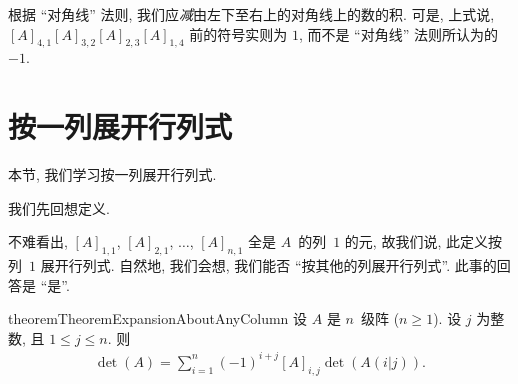 \begin{example}
    根据 ``对角线'' 法则,
    我们应\emph{减}由左下至右上的对角线上的数的积.
    可是, 上式说,
    \([A]_{4,1} [A]_{3,2} [A]_{2,3} [A]_{1,4}\)
    前的符号实则为 \(1\),
    而不是 ``对角线'' 法则所认为的 \(-1\).
    \begin{tikzbildo*}[h!]
        \centering
    \end{tikzbildo*}
\end{example}

\section{按一列展开行列式}

本节, 我们学习按一列展开行列式.

我们先回想定义.

\DefinitionDeterminants*

不难看出,
\([A]_{1,1}\), \([A]_{2,1}\), \(\dots\), \([A]_{n,1}\)
全是 \(A\)~的列~\(1\) 的元,
故我们说,
此定义按列~\(1\) 展开行列式.
自然地, 我们会想,
我们能否 ``按其他的列展开行列式''.
此事的回答是 ``是''.

\begin{restatable}[]{theorem}{TheoremExpansionAboutAnyColumn}
    设 \(A\) 是 \(n\)~级阵 (\(n \geq 1\)).
    设 \(j\) 为整数, 且 \(1 \leq j \leq n\).
    则
    \begin{align*}
        \det {(A)} = \sum_{i = 1}^{n}
        {(-1)^{i+j} [A]_{i,j} \det {(A(i|j))}}.
    \end{align*}
\end{restatable}

